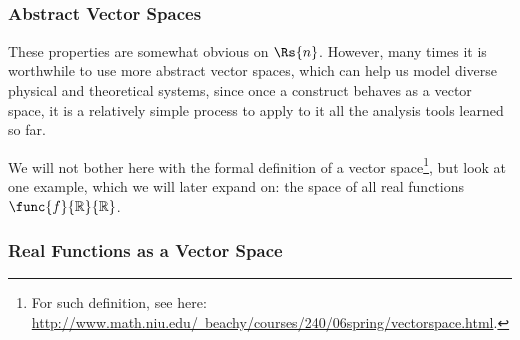\begin{frame}
\begin{itemize}
{\begin{presentation_example}
\begin{align*}
						\end{align*}
					\end{presentation_example}
			}
	\end{itemize}
\end{frame}

\begin{frame}
	\frametitle{Abstract Vector Spaces}
	These properties are somewhat obvious on $\Rs{n}$. However, many times it is worthwhile to use more abstract vector spaces, which can help us model diverse physical and theoretical systems, since once a construct behaves as a vector space, it is a relatively simple process to apply to it all the analysis tools learned so far.

	We will not bother here with the formal definition of a vector space\footnote{For such definition, see here: \href{http://www.math.niu.edu/~beachy/courses/240/06spring/vectorspace.html}{http://www.math.niu.edu/~beachy/courses/240/06spring/vectorspace.html}.}, but look at one example, which we will later expand on: the space of all real functions $\func{f}{\mathbb{R}}{\mathbb{R}}$.
\end{frame}

\begin{frame}
	\frametitle{Real Functions as a Vector Space}
	\begin{itemize}
	\end{itemize}
\end{frame}

